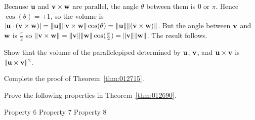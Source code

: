 \begin{multicols}{2}
\begin{ex}
\begin{sol}
Because $\textbf{u}$ and $\textbf{v} \times \textbf{w}$ are parallel, the angle $\theta$ between them is $0$ or $\pi$. Hence $\cos(\theta) = \pm 1$, so the volume is $|\textbf{u} \cdot (\textbf{v} \times \textbf{w})| = \|\textbf{u}\|\|\textbf{v} \times \textbf{w}\| \cos(\theta) = \|\textbf{u}\|\|(\textbf{v} \times \textbf{w})\|$. But the angle between $\textbf{v}$ and $\textbf{w}$ is $\frac{\pi}{2}$ so $\|\textbf{v} \times \textbf{w}\| = \|\textbf{v} \| \|\textbf{w}\| \cos(\tfrac{\pi}{2}) = \|\textbf{v}\|\|\textbf{w}\|$. The result follows.
\end{sol}
\end{ex}

\begin{ex}
Show that the volume of the parallelepiped determined by $\textbf{u}$, $\textbf{v}$, and $\textbf{u} \times \textbf{v}$ is $\|\textbf{u} \times \textbf{v}\|^{2}$.
\end{ex}

\begin{ex} \label{ex:ch4_3_ex14}
Complete the proof of Theorem~\ref{thm:012715}.
\end{ex}

\begin{ex} \label{ex:ch4_3_ex15}
Prove the following properties in Theorem~\ref{thm:012690}.

\begin{exenumerate}
\exitem Property 6
\exitem Property 7
\exitem Property 8
\end{exenumerate}


\end{ex}
\end{multicols}
